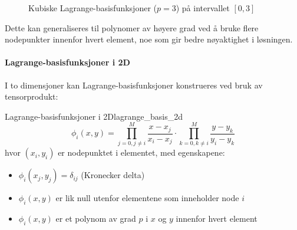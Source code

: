 \documentclass[../main.tex]{subfiles}
\begin{document}
\begin{figure}[H]
    \centering
    \caption{Kubiske Lagrange-basisfunksjoner ($p=3$) på intervallet $[0,3]$}
    \label{fig:lagrange_basis_cubic}
\end{figure}

Dette kan generaliseres til polynomer av høyere grad ved å bruke flere nodepunkter innenfor hvert element, noe som gir bedre nøyaktighet i løsningen.

\paragraph{Lagrange-basisfunksjoner i 2D}
I to dimensjoner kan Lagrange-basisfunksjoner konstrueres ved bruk av tensorprodukt:

\begin{definition}{Lagrange-basisfunksjoner i 2D}{lagrange_basis_2d}
    \[
        \phi_i(x, y) = \prod_{j=0, j \neq i}^{M} \frac{x - x_j}{x_i - x_j} \cdot \prod_{k=0, k \neq i}^{M} \frac{y - y_k}{y_i - y_k}
    \]
    hvor $(x_i, y_i)$ er nodepunktet i elementet, med egenskapene:
    \begin{itemize}
        \item $\phi_i(x_j, y_j) = \delta_{ij}$ (Kronecker delta)
        \item $\phi_i(x, y)$ er lik null utenfor elementene som inneholder node $i$
        \item $\phi_i(x, y)$ er et polynom av grad $p$ i $x$ og $y$ innenfor hvert element
    \end{itemize}
\end{definition}
\end{document}
